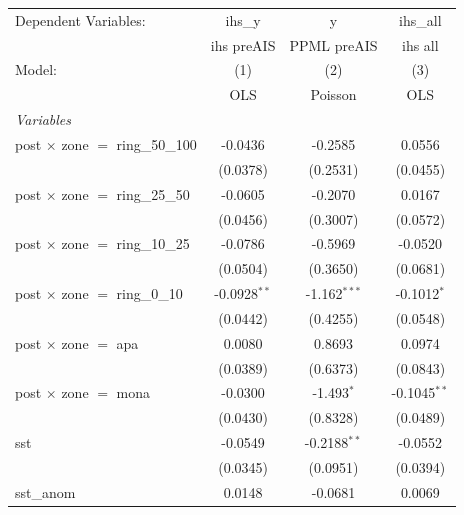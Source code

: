 
\begingroup
\centering
\begin{tabular}{lccc}
   \tabularnewline \midrule \midrule
   Dependent Variables:                    & ihs\_y         & y              & ihs\_all\\   
                                           & ihs preAIS     & PPML preAIS    & ihs all \\   
   Model:                                  & (1)            & (2)            & (3)\\  
                                           &  OLS           & Poisson        & OLS\\  
   \midrule
   \emph{Variables}\\
   post $\times$ zone $=$ ring\_50\_100    & -0.0436        & -0.2585        & 0.0556\\   
                                           & (0.0378)       & (0.2531)       & (0.0455)\\   
   post $\times$ zone $=$ ring\_25\_50     & -0.0605        & -0.2070        & 0.0167\\   
                                           & (0.0456)       & (0.3007)       & (0.0572)\\   
   post $\times$ zone $=$ ring\_10\_25     & -0.0786        & -0.5969        & -0.0520\\   
                                           & (0.0504)       & (0.3650)       & (0.0681)\\   
   post $\times$ zone $=$ ring\_0\_10      & -0.0928$^{**}$ & -1.162$^{***}$ & -0.1012$^{*}$\\   
                                           & (0.0442)       & (0.4255)       & (0.0548)\\   
   post $\times$ zone $=$ apa              & 0.0080         & 0.8693         & 0.0974\\   
                                           & (0.0389)       & (0.6373)       & (0.0843)\\   
   post $\times$ zone $=$ mona             & -0.0300        & -1.493$^{*}$   & -0.1045$^{**}$\\   
                                           & (0.0430)       & (0.8328)       & (0.0489)\\   
   sst                                     & -0.0549        & -0.2188$^{**}$ & -0.0552\\   
                                           & (0.0345)       & (0.0951)       & (0.0394)\\   
   sst\_anom                               & 0.0148         & -0.0681        & 0.0069\\   

\end{tabular}
